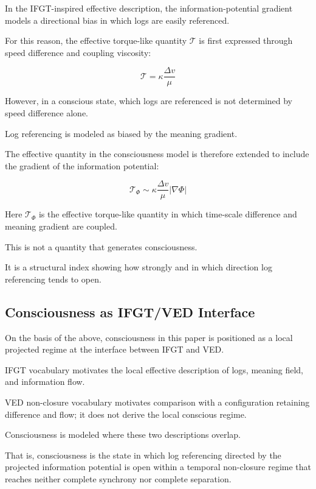 In the IFGT-inspired effective description, the information-potential gradient models a directional bias in which logs are easily referenced.

For this reason, the effective torque-like quantity $\mathcal{T}$ is first expressed through speed difference and coupling viscosity:

\begin{equation}
\mathcal{T} = \kappa \frac{\Delta v}{\mu}
\end{equation}

However, in a conscious state, which logs are referenced is not determined by speed difference alone.

Log referencing is modeled as biased by the meaning gradient.

The effective quantity in the consciousness model is therefore extended to include the gradient of the information potential:

\begin{equation}
\mathcal{T}_{\Phi} \sim \kappa \frac{\Delta v}{\mu} |\nabla \Phi|
\end{equation}

Here $\mathcal{T}_{\Phi}$ is the effective torque-like quantity in which time-scale difference and meaning gradient are coupled.

This is not a quantity that generates consciousness.

It is a structural index showing how strongly and in which direction log referencing tends to open.

\subsection{Consciousness as IFGT/VED Interface}


On the basis of the above, consciousness in this paper is positioned as a local projected regime at the interface between IFGT and VED.

IFGT vocabulary motivates the local effective description of logs, meaning field, and information flow.

VED non-closure vocabulary motivates comparison with a configuration retaining difference and flow; it does not derive the local conscious regime.

Consciousness is modeled where these two descriptions overlap.

That is, consciousness is the state in which log referencing directed by the projected information potential is open within a temporal non-closure regime that reaches neither complete synchrony nor complete separation.

